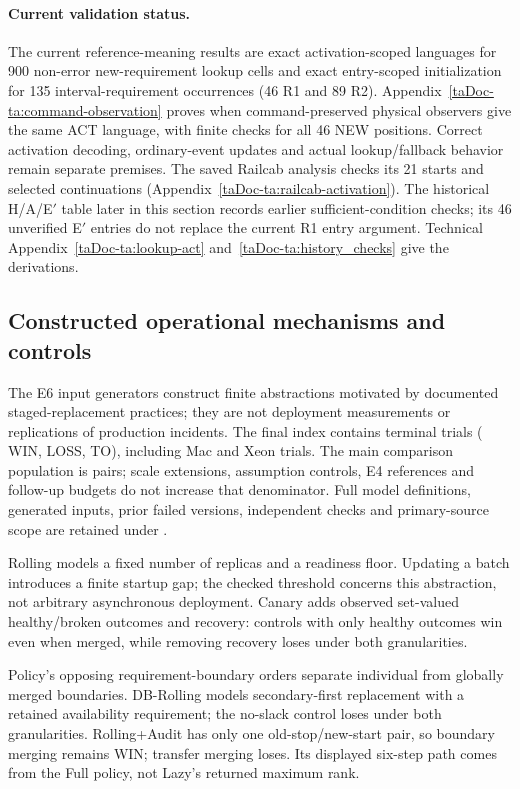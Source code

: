 \documentclass[11pt]{article}
\begin{document}
\paragraph{Current validation status.}
The current reference-meaning results are exact activation-scoped languages for 900 non-error new-requirement lookup cells and exact entry-scoped initialization for 135 interval-requirement occurrences (46 R1 and 89 R2). Appendix~\ref{taDoc-ta:command-observation} proves when command-preserved physical observers give the same ACT language, with finite checks for all 46 NEW positions. Correct activation decoding, ordinary-event updates and actual lookup/fallback behavior remain separate premises. The saved Railcab analysis checks its 21 starts and selected continuations (Appendix~\ref{taDoc-ta:railcab-activation}). The historical H/A/E$'$ table later in this section records earlier sufficient-condition checks; its 46 unverified E$'$ entries do not replace the current R1 entry argument. Technical Appendix~\ref{taDoc-ta:lookup-act} and~\ref{taDoc-ta:history_checks} give the derivations.


\subsection{Constructed operational mechanisms and controls}
\label{supp:vthree-mechanisms}
The E6 input generators construct finite abstractions motivated by documented staged-replacement practices; they are not deployment measurements or replications of production incidents. The final index contains \VThreeESixTrials{} terminal trials (\VThreeESixWin{} WIN, \VThreeESixLoss{} LOSS, \VThreeESixTO{} TO), including \VThreeESixMacTrials{} Mac and \VThreeESixXeonTrials{} Xeon trials. The main comparison population is \VThreeESixMainPairs{} pairs; scale extensions, assumption controls, E4 references and follow-up budgets do not increase that denominator. Full model definitions, generated inputs, prior failed versions, independent checks and primary-source scope are retained under .

Rolling models a fixed number of replicas and a readiness floor. Updating a batch introduces a finite startup gap; the checked threshold concerns this abstraction, not arbitrary asynchronous deployment. Canary adds observed set-valued healthy/broken outcomes and recovery: controls with only healthy outcomes win even when merged, while removing recovery loses under both granularities.

Policy's opposing requirement-boundary orders separate individual from globally merged boundaries. DB-Rolling models secondary-first replacement with a retained availability requirement; the no-slack control loses under both granularities. Rolling+Audit has only one old-stop/new-start pair, so boundary merging remains WIN; transfer merging loses. Its displayed six-step path comes from the Full policy, not Lazy's returned maximum rank.
\end{document}
